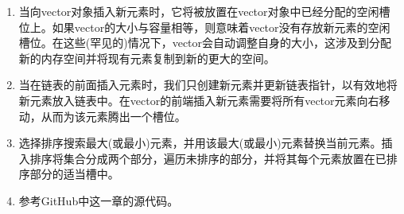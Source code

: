 \begin{enumerate}
	\item 当向vector对象插入新元素时，它将被放置在vector对象中已经分配的空闲槽位上。如果vector的大小与容量相等，则意味着vector没有存放新元素的空闲槽位。在这些(罕见的)情况下，vector会自动调整自身的大小，这涉及到分配新的内存空间并将现有元素复制到新的更大的空间。
	\item 当在链表的前面插入元素时，我们只创建新元素并更新链表指针，以有效地将新元素放入链表中。在vector的前端插入新元素需要将所有vector元素向右移动，从而为该元素腾出一个槽位。
	\item 选择排序搜索最大(或最小)元素，并用该最大(或最小)元素替换当前元素。插入排序将集合分成两个部分，遍历未排序的部分，并将其每个元素放置在已排序部分的适当槽中。
	\item 参考GitHub中这一章的源代码。
\end{enumerate}












